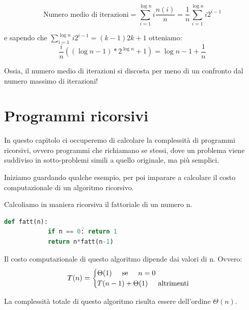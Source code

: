 \begin{equation*}
    \text{Numero medio di iterazioni}=\sum^{\log n}_{i=1}i\frac{n(i)}{n}=\frac{1}{n}\sum^{\log n}_{i=1}i2^{i-1}
\end{equation*}

e sapendo che $\sum^{\log n}_{i=1}i2^{i-1} = (k-1)2k + 1$ otteniamo:
\begin{equation*}
    \frac{i}{n} ((\log n - 1) * 2^{\log n} + 1) = \log n - 1 +\frac{1}{n}
\end{equation*}

Ossia, il numero medio di iterazioni si discosta per meno di un confronto dal numero massimo di iterazioni!

\chapter{Programmi ricorsivi}
In questo capitolo ci occuperemo di calcolare la complessità di programmi ricorsivi, ovvero programmi che richiamano se stessi, dove un problema viene suddiviso in sotto-problemi simili a quello originale, ma più semplici.

Iniziamo guardando qualche esempio, per poi imparare a calcolare il costo computazionale di un algoritmo ricorsivo.

\begin{example}
Calcoliamo in maniera ricorsiva il fattoriale di un numero n.
    \begin{lstlisting}[language=Python]
        def fatt(n):
            if n == 0: return 1
            return n*fatt(n-1)
    \end{lstlisting}
    
    Il costo computazionale di questo algoritmo dipende dai valori di n. Ovvero:
    $$T(n)=\begin{cases}
        \Theta(1)\hspace{0.5cm}\text{se}\hspace{0.5cm}n=0\\
        T(n-1)+\Theta(1)\hspace{0.5cm}\text{altrimenti}
    \end{cases}$$
    
    La complessità totale di questo algoritmo risulta essere dell'ordine $\Theta(n)$.
    
\end{example}

